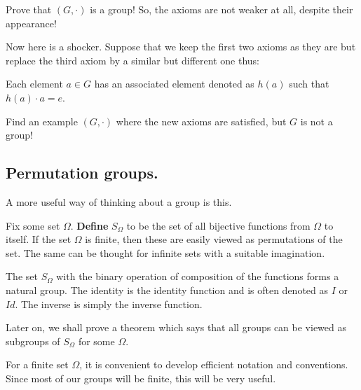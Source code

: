 \documentclass[12pt]{article}
\begin{document}
\begin{enumerate}
\begin{itemize}
Prove that $(G,\cdot )$ is a  group! So, the axioms are not weaker at
all, despite their appearance!

Now here is a shocker. Suppose that we keep the first two axioms as they 
are but replace the third axiom by a similar but different one thus:

Each element $a\in G$ has an associated element denoted as $h(a)$
such that $h(a)\cdot a = e$.

Find an example $(G,\cdot)$ where the new axioms are satisfied, but $G$ is not a
group!
\end{itemize}
\end{enumerate}

\subsection{Permutation groups.}
A more useful way of thinking about a group is this.

Fix some set $\Omega$. {\bf Define} $S_\Omega$ to be the set of all 
bijective functions from $\Omega$ to itself. If the set $\Omega$ is
finite, then these are easily viewed as permutations of the set. The
same can be thought for infinite sets with a suitable imagination.

The set $S_\Omega$ with the binary operation of composition of the
functions forms a natural group. The identity is the identity function
and is often denoted as $I$ or $Id$. The inverse is simply the inverse
function.

Later on, we shall prove a theorem which says that all groups can be
viewed as subgroups  
of $S_\Omega$ for some $\Omega$.

For a finite set $\Omega$, it is convenient to develop efficient
notation and conventions. Since most of our groups will be finite, this 
will be very useful.
\end{document}
